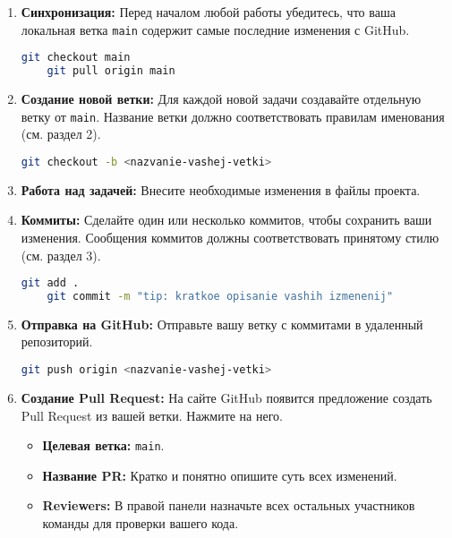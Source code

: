 \documentclass[12pt,a4paper]{article}
\begin{document}
\begin{enumerate}
    \item \textbf{Синхронизация:} Перед началом любой работы убедитесь, что ваша локальная ветка \texttt{main} содержит самые последние изменения с GitHub.
    \begin{lstlisting}[language=bash]
    git checkout main
    git pull origin main
    \end{lstlisting}

    \item \textbf{Создание новой ветки:} Для каждой новой задачи создавайте отдельную ветку от \texttt{main}. Название ветки должно соответствовать правилам именования (см. раздел 2).
    \begin{lstlisting}[language=bash]
    git checkout -b <nazvanie-vashej-vetki>
    \end{lstlisting}

    \item \textbf{Работа над задачей:} Внесите необходимые изменения в файлы проекта.

    \item \textbf{Коммиты:} Сделайте один или несколько коммитов, чтобы сохранить ваши изменения. Сообщения коммитов должны соответствовать принятому стилю (см. раздел 3).
    \begin{lstlisting}[language=bash]
    git add .
    git commit -m "tip: kratkoe opisanie vashih izmenenij"
    \end{lstlisting}

    \item \textbf{Отправка на GitHub:} Отправьте вашу ветку с коммитами в удаленный репозиторий.
    \begin{lstlisting}[language=bash]
    git push origin <nazvanie-vashej-vetki>
    \end{lstlisting}

    \item \textbf{Создание Pull Request:} На сайте GitHub появится предложение создать Pull Request из вашей ветки. Нажмите на него.
    \begin{itemize}
        \item \textbf{Целевая ветка:} \texttt{main}.
        \item \textbf{Название PR:} Кратко и понятно опишите суть всех изменений.
        \item \textbf{Reviewers:} В правой панели назначьте всех остальных участников команды для проверки вашего кода.
    \end{itemize}
\end{enumerate}
\end{document}

